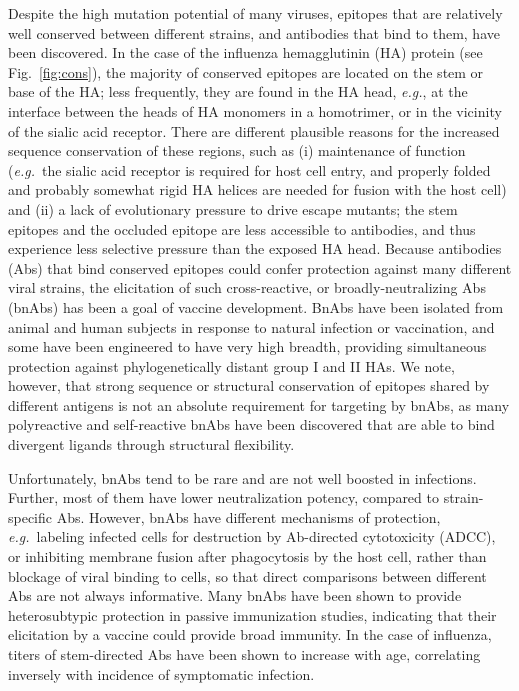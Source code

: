 \documentclass[utf8]{frontiersHLTH}%
\newcommand{\cred}[1]{#1} %
\def\eg {{\it e.g.}}
\newcommand{\fig}[1]{Fig.~\ref{fig:#1}}
\begin{document}
Despite the high mutation potential of many viruses,
epitopes that are relatively well conserved between different strains, and
antibodies that bind to them, have been discovered. In the case of the
influenza hemagglutinin (HA) protein (see \fig{cons}), 
the majority of conserved epitopes are located
on the stem or base of the HA\cite{nachbagauer17,corti17};
less frequently, they are found in the HA head, \eg,
at the interface between the heads of HA monomers\cite{watanabe19,bajic19}
in a homotrimer, or in the vicinity of the sialic acid receptor\cite{raymond18,bajic19a}.
There are different plausible reasons for the increased sequence
conservation of these regions, such as (i) maintenance of function (\eg~the
sialic acid receptor is required for host cell entry, and properly
folded and probably somewhat rigid HA helices are needed for fusion with the
host cell) and (ii) a lack of evolutionary pressure to drive escape
mutants\cite{raymond18}; the stem epitopes and the occluded epitope\cite{watanabe19}
are less accessible to antibodies, and thus
experience less selective pressure than the exposed HA head.
Because antibodies (Abs) that bind conserved epitopes could confer protection
against many different viral strains, the elicitation of such cross-reactive, or
broadly-neutralizing Abs (bnAbs) has been a goal of vaccine development.\cite{nachbagauer17}
BnAbs have been isolated from animal and human subjects in response
to natural infection or vaccination,\cite{corti17} and some have been engineered\cite{kallewaard16}
to have very high breadth, providing simultaneous protection
against phylogenetically distant group I and II HAs.\cite{corti11,li12,kallewaard16}
%
\cred{We note, however, that strong sequence or structural conservation of epitopes
shared by different antigens is not an absolute requirement for targeting
by bnAbs, as many polyreactive and self-reactive bnAbs have been
discovered that are able to bind divergent ligands through structural flexibility.\cite{prigent18,ovchinnikov18}}

Unfortunately, bnAbs tend to be rare and are not well boosted in
infections\cite{li12,ellebedy14,tan19,arevalo20}.
Further, most of them have lower neutralization potency, compared to strain-specific Abs.
However, bnAbs have
different mechanisms of protection, \eg~labeling infected cells for
destruction by Ab-directed cytotoxicity (ADCC), or inhibiting membrane
fusion after phagocytosis by the host cell,\cite{nachbagauer17} rather than blockage of viral
binding to cells, so that direct comparisons between different Abs are not always
informative.
Many bnAbs have been shown to provide heterosubtypic protection in
passive immunization studies,\cite{corti17} indicating that their elicitation by
a vaccine could provide broad immunity. In the case of
influenza, titers of stem-directed Abs have been shown to increase with
age, correlating inversely with incidence of symptomatic
infection.\cite{Nachbagauer16}
\end{document}
